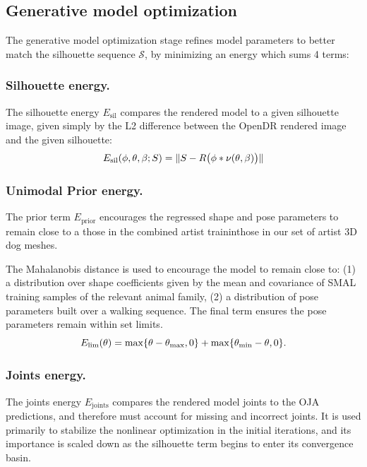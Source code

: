\subsection{Generative model optimization}
\def\E#1{{E_{\text{#1}}}}
The generative model optimization stage refines model parameters to better match the silhouette sequence $\mathcal S$, by minimizing an energy which sums 4 terms:

\def\ss#1{\vspace{-0ex}\subsubsection{#1}}

\ss{Silhouette energy.}
The silhouette energy $\E{sil}$ compares the rendered model to a given silhouette image, given simply by the L2 difference between the OpenDR rendered image and the given silhouette:
\begin{equation}
\E{sil}(\posn, \pose, \shape; S) = \lVert S - R\bigl(\posn * \verts(\pose, \shape)\bigr) \rVert
\end{equation}

\ss{Unimodal Prior energy.}
The prior term $\E{prior}$ encourages the regressed shape and pose parameters to remain close to a those in the combined artist traininthose in our set of artist 3D dog meshes.



The Mahalanobis distance is used to encourage the model to remain close to: (1) a distribution over shape coefficients given by the mean and covariance of SMAL training samples of the relevant animal family, (2) a distribution of pose parameters built over a walking sequence. The final term ensures the pose parameters remain within set limits.
\begin{equation}
\E{lim}(\pose) = \max\{\pose - \pose_{\text{max}}, 0\} + \max\{\pose_{\text{min}} - \pose, 0\}.
\end{equation}

\ss{Joints energy.}
The joints energy $\E{joints}$ compares the rendered model joints to the OJA predictions, and therefore must account for missing and incorrect joints.  It is used primarily to stabilize the nonlinear optimization in the initial iterations, and its importance is scaled down as the silhouette term begins to enter its convergence basin.

